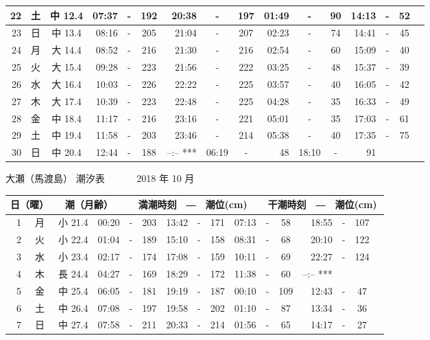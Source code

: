 \documentclass[12pt.a4j]{jsarticle}
\begin{document}
\begin{center}
\begin{table}[ht]
\begin{tabular}{|rc|cr|ccrccr|ccrccr|}
\hline
22 & 土 & 中 12.4 & 07:37 &-& 192 & 20:38 &-& 197 & 01:49 &-&  90 & 14:13 &-&  52 \\
\hline
23 & 日 & 中 13.4 & 08:16 &-& 205 & 21:04 &-& 207 & 02:23 &-&  74 & 14:41 &-&  45 \\
\hline
24 & 月 & 大 14.4 & 08:52 &-& 216 & 21:30 &-& 216 & 02:54 &-&  60 & 15:09 &-&  40 \\
\hline
25 & 火 & 大 15.4 & 09:28 &-& 223 & 21:56 &-& 222 & 03:25 &-&  48 & 15:37 &-&  39 \\
\hline
26 & 水 & 大 16.4 & 10:03 &-& 226 & 22:22 &-& 225 & 03:57 &-&  40 & 16:05 &-&  42 \\
\hline
27 & 木 & 大 17.4 & 10:39 &-& 223 & 22:48 &-& 225 & 04:28 &-&  35 & 16:33 &-&  49 \\
\hline
28 & 金 & 中 18.4 & 11:17 &-& 216 & 23:16 &-& 221 & 05:01 &-&  35 & 17:03 &-&  61 \\
\hline
29 & 土 & 中 19.4 & 11:58 &-& 203 & 23:46 &-& 214 & 05:38 &-&  40 & 17:35 &-&  75 \\
\hline
30 & 日 & 中 20.4 & 12:44 &-& 188 & --:--   *** & 06:19 &-&  48 & 18:10 &-&  91 \\
\hline
\end{tabular}
\end{table}
\newpage
 {\LARGE 大瀬（馬渡島）  潮汐表　　　}
 {\large 2018 年 10 月}\\
 \begin{table}[ht]
 \begin{tabular}{|rc|cr|ccrccr|ccrccr|}
 \hline
 \multicolumn{2}{|c|}{日（曜）} & \multicolumn{2}{c|}{潮（月齢）} & \multicolumn{6}{c|}{満潮時刻　―　潮位(cm)} & \multicolumn{6}{c|}{干潮時刻　―　潮位(cm)} \\
 \hline
 1 & 月 & 小 21.4 & 00:20 &-& 203 & 13:42 &-& 171 & 07:13 &-&  58 & 18:55 &-& 107 \\
\hline
 2 & 火 & 小 22.4 & 01:04 &-& 189 & 15:10 &-& 158 & 08:31 &-&  68 & 20:10 &-& 122 \\
\hline
 3 & 水 & 小 23.4 & 02:17 &-& 174 & 17:08 &-& 159 & 10:11 &-&  69 & 22:27 &-& 124 \\
\hline
 4 & 木 & 長 24.4 & 04:27 &-& 169 & 18:29 &-& 172 & 11:38 &-&  60 & --:--   *** \\
\hline
 5 & 金 & 中 25.4 & 06:05 &-& 181 & 19:19 &-& 187 & 00:10 &-& 109 & 12:43 &-&  47 \\
\hline
 6 & 土 & 中 26.4 & 07:08 &-& 197 & 19:58 &-& 202 & 01:10 &-&  87 & 13:34 &-&  36 \\
\hline
 7 & 日 & 中 27.4 & 07:58 &-& 211 & 20:33 &-& 214 & 01:56 &-&  65 & 14:17 &-&  27 \\

\end{tabular}
\end{table}
\end{center}
\end{document}
